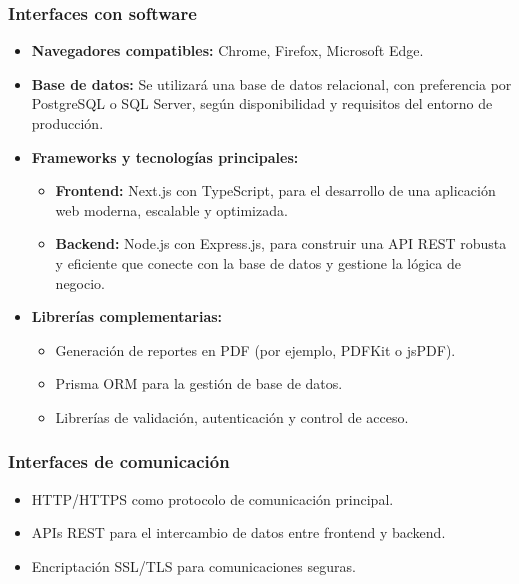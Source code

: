 \subsubsection*{Interfaces con software}

\begin{itemize}
	\item \textbf{Navegadores compatibles:} Chrome, Firefox, Microsoft Edge.

	\item \textbf{Base de datos:} Se utilizará una base de datos relacional, con preferencia por PostgreSQL o SQL Server, según disponibilidad y requisitos del entorno de producción.

	\item \textbf{Frameworks y tecnologías principales:}
	      \begin{itemize}
		      \item \textbf{Frontend:} Next.js con TypeScript, para el desarrollo de una aplicación web moderna, escalable y optimizada.
		      \item \textbf{Backend:} Node.js con Express.js, para construir una API REST robusta y eficiente que conecte con la base de datos y gestione la lógica de negocio.
	      \end{itemize}

	\item \textbf{Librerías complementarias:}
	      \begin{itemize}
		      \item Generación de reportes en PDF (por ejemplo, PDFKit o jsPDF).
		      \item Prisma ORM para la gestión de base de datos.
		      \item Librerías de validación, autenticación y control de acceso.
	      \end{itemize}
\end{itemize}


\subsubsection*{Interfaces de comunicación}

\begin{itemize}
	\item HTTP/HTTPS como protocolo de comunicación principal.
	\item APIs REST para el intercambio de datos entre frontend y backend.
	\item Encriptación SSL/TLS para comunicaciones seguras.
\end{itemize}

